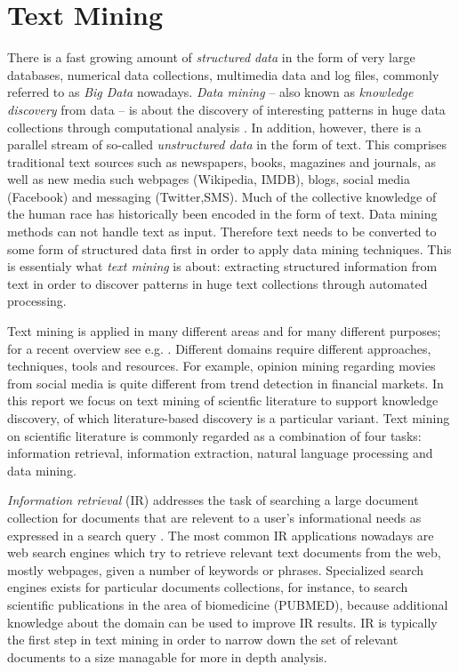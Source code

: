
\chapter{Text Mining}


There is a fast growing amount of \emph{structured data} in the form of very large databases, numerical data collections, multimedia data and log files, commonly referred to as \emph{Big Data} nowadays.
\emph{Data mining} -- also known as \emph{knowledge discovery} from data -- is about the discovery of interesting patterns in huge data collections through computational analysis \citep{han2006data}.
In addition, however, there is a parallel stream of so-called \emph{unstructured data} in the form of text.
This comprises traditional text sources such as newspapers, books, magazines and journals, as well as new media such webpages (Wikipedia, IMDB), blogs, social media (Facebook) and messaging (Twitter,SMS).
Much of the collective knowledge of the human race has historically been encoded in the form of text. 
Data mining methods can not handle text as input.
Therefore text needs to be converted to some form of structured data first in order to apply data mining techniques.
This is essentialy what \emph{text mining} is about: extracting structured information from text in order to discover patterns in huge text collections through automated processing.

Text mining is applied in many different areas and for many different purposes; for a recent overview see e.g. \citep{Aggarwal2012Mining,Weiss2012Fundamentals}.
Different domains require different approaches, techniques, tools and resources.
For example, opinion mining regarding movies from social media is quite different from trend detection in financial markets. 
In this report we focus on text mining of scientfic literature to support knowledge discovery, of which literature-based discovery is a particular variant.
Text mining on scientific literature is commonly regarded as a combination of four tasks: information retrieval, information extraction, natural language processing and data mining.

\emph{Information retrieval} (IR) addresses the task of searching a large document collection for documents that are relevent to a user's informational needs as expressed in a search query \citep{ManningRaghavanSchutze:08}. 
The most common IR applications nowadays are web search engines which try to retrieve relevant text documents from the web, mostly webpages, given a number of keywords or phrases.
Specialized search engines exists for particular documents collections, for instance, to search scientific publications in the area of biomedicine (PUBMED), because additional knowledge about the domain can be used to improve IR results.
IR is typically the first step in text mining in order to narrow down the set of relevant documents to a size managable for more in depth analysis.

